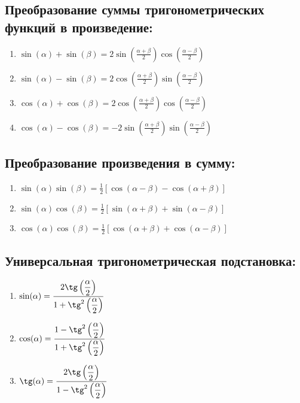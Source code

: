 \documentclass[12pt, a6paper]{extarticle}
\begin{document}
\subsection{Преобразование суммы тригонометрических функций в произведение:}
\begin{enumerate}
	\item $ \sin(\alpha)+\sin(\beta) =\displaystyle   2\sin\left(\frac{\alpha+\beta}{2}\right)\cos\left(\frac{\alpha-\beta}{2}\right) $ \\
	\item $ \sin(\alpha)-\sin(\beta) =\displaystyle   2\cos\left(\frac{\alpha+\beta}{2}\right)\sin\left(\frac{\alpha-\beta}{2}\right) $ \\
	\item $ \cos(\alpha)+\cos(\beta) =\displaystyle   2\cos\left(\frac{\alpha+\beta}{2}\right)\cos\left(\frac{\alpha-\beta}{2}\right) $ \\
	\item $ \cos(\alpha)-\cos(\beta) =\displaystyle  -2\sin\left(\frac{\alpha+\beta}{2}\right)\sin\left(\frac{\alpha-\beta}{2}\right) $ \\
\end{enumerate}
\subsection{Преобразование произведения в сумму:}
\begin{enumerate}
	\item $ \sin(\alpha)\sin(\beta) =\displaystyle  \frac{1}{2} [\cos(\alpha-\beta) - \cos(\alpha+\beta)]$ \\
	\item $ \sin(\alpha)\cos(\beta) =\displaystyle  \frac{1}{2} [\sin(\alpha+\beta) + \sin(\alpha-\beta)]$ \\
	\item $ \cos(\alpha)\cos(\beta) =\displaystyle  \frac{1}{2} [\cos(\alpha+\beta) + \cos(\alpha-\beta)]$ \\
\end{enumerate}
\subsection{Универсальная тригонометрическая подстановка:}
\begin{enumerate}
	\item $ \sin(\alpha) =\displaystyle \frac{2\tg\left(\displaystyle\frac{\alpha}{2}\right)}{1+\tg^2\left(\displaystyle\frac{\alpha}{2}\right)}$
	\item $ \cos(\alpha) =\displaystyle \frac{1-\tg^2\left(\displaystyle\frac{\alpha}{2}\right)}{1+\tg^2\left(\displaystyle\frac{\alpha}{2}\right)}$ 
	\item $ \tg(\alpha)  =\displaystyle \frac{2\tg\left(\displaystyle\frac{\alpha}{2}\right)}{1-\tg^2\left(\displaystyle\frac{\alpha}{2}\right)}$
\end{enumerate}
\end{document}

